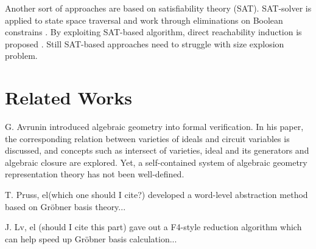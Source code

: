 \documentclass{acm_proc_article-sp}
\begin{document}
Another sort of approaches are based on satisfiability theory (SAT). SAT-solver is applied to state space traversal and 
work through eliminations on Boolean constrains \cite{coudert1990verification}. By exploiting SAT-based algorithm, direct
reachability induction is proposed \cite{bjesse2000sat}. Still SAT-based approaches need to struggle with size explosion problem.

\section{Related Works}
G. Avrunin \cite{avrunin1996symbolic} introduced algebraic geometry into formal verification. In his paper, the corresponding
relation between varieties of ideals and circuit variables is discussed, and concepts such as intersect of varieties, ideal and
its generators and algebraic closure are explored. Yet, a self-contained system of algebraic geometry representation theory has
not been well-defined.

T. Pruss, el(which one should I cite?) developed a word-level abstraction method based on  Gr\"obner basis theory...

J. Lv, el (should I cite this part) gave out a F4-style reduction algorithm which can help speed up Gr\"obner basis calculation...


%
\balancecolumns
\end{document}
